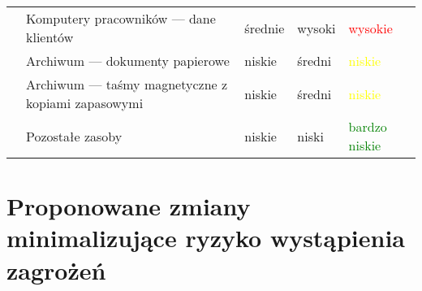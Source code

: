 \begin{landscape}
\begin{longtable}[!ht]{|m{4cm}|m{6cm}|m{4.5cm}|m{3cm}|m{3cm}|}
			& Komputery pracowników --- dane klientów & średnie & wysoki & \textcolor{red}{wysokie} \\ \cline{2-5} 
			& Archiwum --- dokumenty papierowe & niskie & średni & \textcolor{yellow}{niskie} \\ \cline{2-5} 
			& Archiwum --- taśmy magnetyczne z kopiami zapasowymi & niskie & średni & \textcolor{yellow}{niskie} \\ \cline{2-5}
			& Pozostałe zasoby &  niskie & niski & \textcolor{green}{bardzo niskie} \\ \cline{2-5}
		\hline
\end{longtable}
\end{landscape}

\newpage\section{Proponowane zmiany minimalizujące ryzyko wystąpienia zagrożeń}

